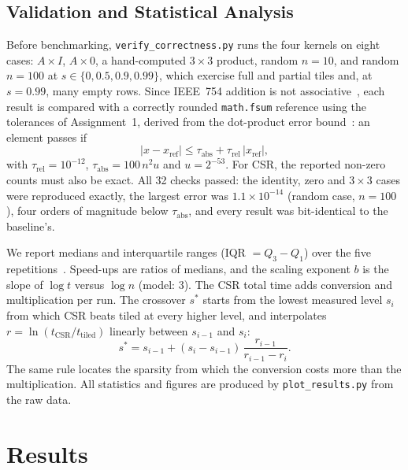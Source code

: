 \documentclass[conference,a4paper]{IEEEtran}
\newcommand{\code}[1]{\texttt{#1}}
\begin{document}
\subsection{Validation and Statistical Analysis}
Before benchmarking, \code{verify\_correctness.py} runs the four kernels on
eight cases: $A \times I$, $A \times 0$, a hand-computed $3 \times 3$ product,
random $n = 10$, and random $n = 100$ at $s \in \{0, 0.5, 0.9, 0.99\}$, which
exercise full and partial tiles and, at $s = 0.99$, many empty rows. Since
IEEE~754 addition is not associative~\cite{ieee754}, each result is compared
with a correctly rounded \code{math.fsum} reference using the tolerances of
Assignment~1, derived from the dot-product error bound~\cite{higham2002}: an
element passes if
\begin{equation}
  |x - x_{\text{ref}}| \le \tau_{\text{abs}} + \tau_{\text{rel}}\, |x_{\text{ref}}|,
\end{equation}
with $\tau_{\text{rel}} = 10^{-12}$, $\tau_{\text{abs}} = 100\, n^2 u$ and
$u = 2^{-53}$. For CSR, the reported non-zero counts must also be exact. All 32
checks passed: the identity, zero and $3 \times 3$ cases were reproduced
exactly, the largest error was $1.1 \times 10^{-14}$ (random case, $n = 100$),
four orders of magnitude below $\tau_{\text{abs}}$, and every result was
bit-identical to the baseline's.

We report medians and interquartile ranges (IQR $= Q_3 - Q_1$) over the five
repetitions~\cite{georges2007,kalibera2013}. Speed-ups are ratios of medians,
and the scaling exponent $b$ is the slope of $\log t$ versus $\log n$ (model:
3). The CSR total time adds conversion and multiplication per run. The
crossover $s^*$ starts from the lowest measured level $s_i$ from which CSR beats
tiled at every higher level, and interpolates
$r = \ln(t_{\text{CSR}} / t_{\text{tiled}})$ linearly between $s_{i-1}$ and
$s_i$:
\begin{equation}
  s^* = s_{i-1} + (s_i - s_{i-1})\, \frac{r_{i-1}}{r_{i-1} - r_i}.
  \label{eq:crossover}
\end{equation}
The same rule locates the sparsity from which the conversion costs more than
the multiplication. All statistics and figures are produced by
\code{plot\_results.py} from the raw data.

\section{Results}
\label{sec:results}
\end{document}
